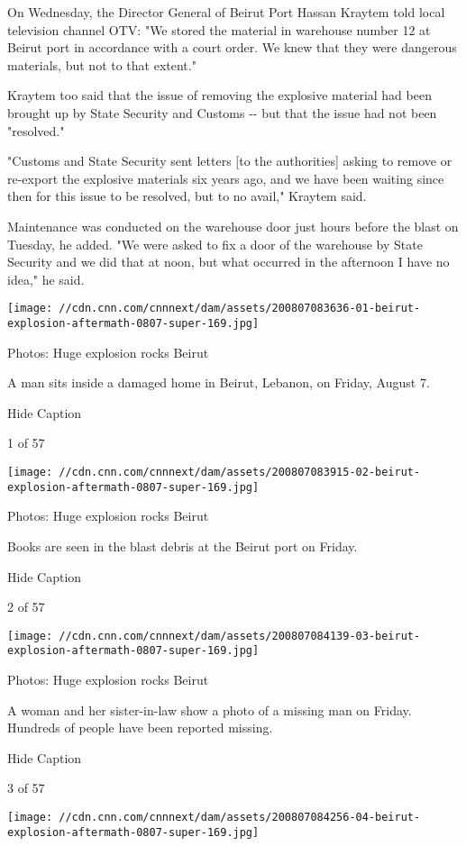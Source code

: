 On Wednesday, the Director General of Beirut Port Hassan Kraytem told
local television channel OTV: "We stored the material in warehouse
number 12 at Beirut port in accordance with a court order. We knew that
they were dangerous materials, but not to that extent."

Kraytem too said that the issue of removing the explosive material had
been brought up by State Security and Customs -\/- but that the issue
had not been "resolved."

"Customs and State Security sent letters {[}to the authorities{]} asking
to remove or re-export the explosive materials six years ago, and we
have been waiting since then for this issue to be resolved, but to no
avail," Kraytem said.

Maintenance was conducted on the warehouse door just hours before the
blast on Tuesday, he added. "We were asked to fix a door of the
warehouse by State Security and we did that at noon, but what occurred
in the afternoon I have no idea," he said.

\texttt{[image: //cdn.cnn.com/cnnnext/dam/assets/200807083636-01-beirut-explosion-aftermath-0807-super-169.jpg]}

Photos: Huge explosion rocks Beirut

A man sits inside a damaged home in Beirut, Lebanon, on Friday, August
7.

Hide Caption

1 of 57

\texttt{[image: //cdn.cnn.com/cnnnext/dam/assets/200807083915-02-beirut-explosion-aftermath-0807-super-169.jpg]}

Photos: Huge explosion rocks Beirut

Books are seen in the blast debris at the Beirut port on Friday.

Hide Caption

2 of 57

\texttt{[image: //cdn.cnn.com/cnnnext/dam/assets/200807084139-03-beirut-explosion-aftermath-0807-super-169.jpg]}

Photos: Huge explosion rocks Beirut

A woman and her sister-in-law show a photo of a missing man on Friday.
Hundreds of people have been reported missing.

Hide Caption

3 of 57

\texttt{[image: //cdn.cnn.com/cnnnext/dam/assets/200807084256-04-beirut-explosion-aftermath-0807-super-169.jpg]}

